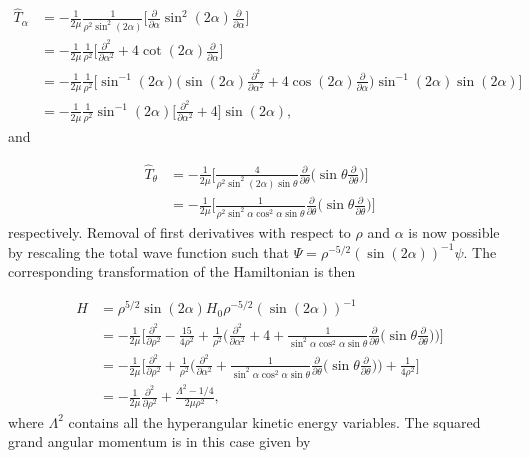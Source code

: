 \documentclass{article}
\numberwithin{equation}{section}
\numberwithin{figure}{section}
\begin{document}
\begin{align}
\hat{T}_{\alpha} &= -\frac{1}{2\mu}  \frac{1}{\rho^2 \sin^2(2\alpha)}  \bigg[ \frac{\partial}{\partial\alpha} \sin^2(2\alpha) \frac{\partial}{\partial\alpha} \bigg]\nonumber\\ 
&= -\frac{1}{2\mu} \frac{1}{\rho^2} \bigg[ \frac{\partial^2}{\partial\alpha^2} + 4\cot(2\alpha) \frac{\partial}{\partial\alpha} \bigg]\nonumber\\
&= -\frac{1}{2\mu} \frac{1}{\rho^2} \bigg[ \sin^{-1}(2\alpha) \bigg(\sin(2\alpha)\frac{\partial^2}{\partial\alpha^2} + 4\cos(2\alpha) \frac{\partial}{\partial\alpha} \bigg) \sin^{-1}(2\alpha) \sin(2\alpha) \bigg]\nonumber\\
&= -\frac{1}{2\mu} \frac{1}{\rho^2}\sin^{-1}(2\alpha) \bigg[ \frac{\partial^2}{\partial\alpha^2} + 4 \bigg] \sin(2\alpha),
\end{align} 
and

\begin{align}                  
\hat{T}_{\theta} &= -\frac{1}{2\mu} \bigg[ \frac{4}{\rho^2 \sin^2(2\alpha)\sin\theta} \frac{\partial}{\partial\theta} \bigg( \sin\theta \frac{\partial}{\partial\theta} \bigg) \bigg]\nonumber\\ 
&= -\frac{1}{2\mu} \bigg[ \frac{1}{\rho^2 \sin^2\alpha\cos^2\alpha\sin\theta} \frac{\partial}{\partial\theta} \bigg( \sin\theta \frac{\partial}{\partial\theta} \bigg) \bigg]
\end{align}
respectively. Removal of first derivatives with respect to $\rho$ and $\alpha$ is now possible by rescaling the total wave function such that $\Psi = \rho^{-5/2}(\sin(2\alpha))^{-1}\psi$. The corresponding transformation of the Hamiltonian is then

\begin{align}
H&= \rho^{5/2}\sin(2\alpha) H_0 \rho^{-5/2}(\sin(2\alpha))^{-1}\nonumber\\
&= -\frac{1}{2\mu} \bigg[ \frac{\partial^2}{\partial\rho^2} - \frac{15}{4\rho^2} + \frac{1}{\rho^2}\bigg( \frac{\partial^2}{\partial\alpha^2} + 4 + \frac{1}{\sin^2\alpha\cos^2\alpha\sin\theta} \frac{\partial}{\partial\theta} \bigg( \sin\theta \frac{\partial}{\partial\theta} \bigg) \bigg) \bigg]\nonumber\\
&= -\frac{1}{2\mu} \bigg[ \frac{\partial^2}{\partial\rho^2} + \frac{1}{\rho^2}\bigg( \frac{\partial^2}{\partial\alpha^2} + \frac{1}{\sin^2\alpha\cos^2\alpha\sin\theta} \frac{\partial}{\partial\theta} \bigg( \sin\theta \frac{\partial}{\partial\theta} \bigg) \bigg) + \frac{1}{4\rho^2} \bigg]\nonumber\\
&= -\frac{1}{2\mu}\frac{\partial^2}{\partial\rho^2} + \frac{\Lambda^2 - 1/4}{2\mu\rho^2},
\end{align}   
where $\Lambda^2$ contains all the hyperangular kinetic energy variables. The squared grand angular momentum is in this case given by 
\end{document}
